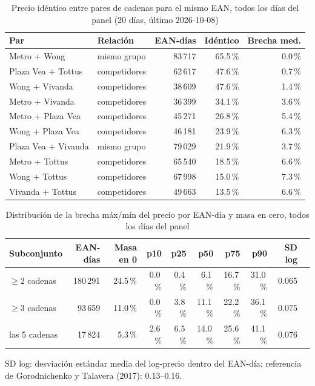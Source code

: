 
\begin{table}[htbp]
\caption{Precio id\'entico entre pares de cadenas para el mismo EAN, todos los d\'ias del panel (20 d\'ias, \'ultimo 2026-10-08)}
\label{tab:identidad}
\centering\scriptsize\setlength{\tabcolsep}{3pt}
\begin{tabular}{@{}llrrr@{}}
\toprule
Par & Relaci\'on & EAN-d\'ias & Id\'entico & Brecha med. \\
\midrule
Metro + Wong & mismo grupo & 83\,717 & 65.5\,\% & 0.0\,\% \\
Plaza Vea + Tottus & competidores & 62\,617 & 47.6\,\% & 0.7\,\% \\
Wong + Vivanda & competidores & 38\,609 & 47.6\,\% & 1.4\,\% \\
Metro + Vivanda & competidores & 36\,399 & 34.1\,\% & 3.6\,\% \\
Metro + Plaza Vea & competidores & 45\,271 & 26.8\,\% & 5.4\,\% \\
Wong + Plaza Vea & competidores & 46\,181 & 23.9\,\% & 6.3\,\% \\
Plaza Vea + Vivanda & mismo grupo & 79\,029 & 21.9\,\% & 3.7\,\% \\
Metro + Tottus & competidores & 65\,540 & 18.5\,\% & 6.6\,\% \\
Wong + Tottus & competidores & 67\,998 & 15.0\,\% & 7.3\,\% \\
Vivanda + Tottus & competidores & 49\,663 & 13.5\,\% & 6.6\,\% \\
\bottomrule\end{tabular}\end{table}

\begin{table}[t]
\caption{Distribuci\'on de la brecha m\'ax/m\'in del precio por EAN-d\'ia y masa en cero, todos los d\'ias del panel}
\label{tab:brecha}
\centering\scriptsize\setlength{\tabcolsep}{4pt}
\begin{tabular}{@{}lrrrrrrrrr@{}}
\toprule
Subconjunto & EAN-d\'ias & Masa en 0 & p10 & p25 & p50 & p75 & p90 & SD log \\
\midrule
$\geq 2$ cadenas & 180\,291 & 24.5\,\% & 0.0\,\% & 0.4\,\% & 6.1\,\% & 16.7\,\% & 31.0\,\% & 0.065 \\
$\geq 3$ cadenas & 93\,659 & 11.0\,\% & 0.0\,\% & 3.8\,\% & 11.1\,\% & 22.2\,\% & 36.1\,\% & 0.075 \\
las 5 cadenas & 17\,824 & 5.3\,\% & 2.6\,\% & 6.5\,\% & 14.0\,\% & 25.6\,\% & 41.1\,\% & 0.076 \\
\bottomrule\end{tabular}
\par\smallskip\raggedright\scriptsize SD log: desviaci\'on est\'andar media del log-precio dentro del EAN-d\'ia; referencia de Gorodnichenko y Talavera (2017): 0.13--0.16.
\end{table}

